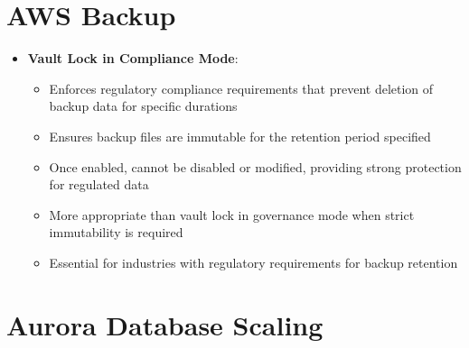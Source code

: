 \documentclass[11pt,a4paper]{report}
\begin{document}
\section{AWS Backup}

\begin{itemize}
  \item \textbf{Vault Lock in Compliance Mode}:
\begin{itemize}
  \item Enforces regulatory compliance requirements that prevent deletion of backup data for specific durations
  \item Ensures backup files are immutable for the retention period specified
  \item Once enabled, cannot be disabled or modified, providing strong protection for regulated data
  \item More appropriate than vault lock in governance mode when strict immutability is required
  \item Essential for industries with regulatory requirements for backup retention
\end{itemize}
\end{itemize}


\section{Aurora Database Scaling}
\end{document}
